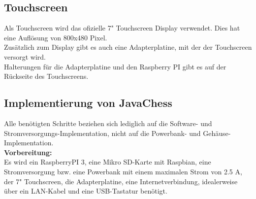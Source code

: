 \documentclass[12pt,a4paper]{article}
\begin{document}
{\subsection{Touchscreen}

Als Touchscreen wird das ofizielle 7" Touchscreen Display verwendet. Dies hat eine Auflösung von 800x480 Pixel.\cite{RaspiScreen} \\
Zusätzlich zum Display gibt es auch eine Adapterplatine, mit der der Touchscreen versorgt wird. \\
Halterungen für die Adapterplatine und den Raspberry PI gibt es auf der Rückseite des Touchscreens.

\subsection{Implementierung von JavaChess}
\label{SUBSEC:IMPLEMENTJAVACHESS}

Alle benötigten Schritte beziehen sich lediglich auf die Software- und Stromversorgungs-Implementation, nicht auf die Powerbank- und Gehäuse-Implementation. \\[1ex]
\textbf{Vorbereitung:} \\[2ex]
Es wird ein RaspberryPI 3, eine Mikro SD-Karte mit Raspbian, eine Stromversorgung bzw. eine Powerbank mit einem maximalen Strom von 2.5 A, der 7" Touchscreen, die Adapterplatine, eine Internetverbindung, idealerweise über ein LAN-Kabel und eine USB-Tastatur benötigt. \\

}
\end{document}
